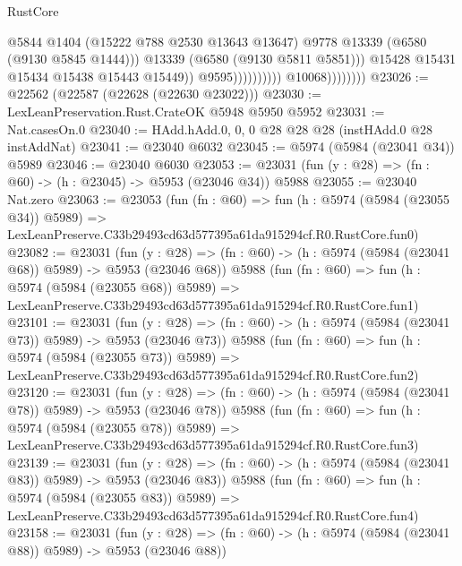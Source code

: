 \begin{lexlean}{RustCore}
\begin{coremodule}
                                                @5844
                                                @1404
                                                (@15222 @788 @2530 @13643 @13647)
                                                @9778
                                                @13339
                                                (@6580 (@9130 @5845 @1444)))
                                              @13339
                                              (@6580 (@9130 @5811 @5851)))
                                            @15428
                                            @15431
                                            @15434
                                            @15438
                                            @15443
                                            @15449))
                                        @9595))))))))))
                    @10068))))))))
@23026 := @22562 (@22587 (@22628 (@22630 @23022)))
@23030 := LexLeanPreservation.Rust.CrateOK @5948 @5950 @5952
@23031 := Nat.casesOn.{0}
@23040 := HAdd.hAdd.{0, 0, 0} @28 @28 @28 (instHAdd.{0} @28 instAddNat)
@23041 := @23040 @6032
@23045 := @5974 (@5984 (@23041 @34)) @5989
@23046 := @23040 @6030
@23053 := @23031 (fun (y : @28) => (fn : @60) -> (h : @23045) -> @5953 (@23046 @34)) @5988
@23055 := @23040 Nat.zero
@23063 := @23053
    (fun (fn : @60) =>
    fun (h : @5974 (@5984 (@23055 @34)) @5989) =>
    LexLeanPreserve.C33b29493cd63d577395a61da915294cf.R0.RustCore.fun0)
@23082 := @23031
    (fun (y : @28) => (fn : @60) -> (h : @5974 (@5984 (@23041 @68)) @5989) -> @5953 (@23046 @68))
    @5988
    (fun (fn : @60) =>
    fun (h : @5974 (@5984 (@23055 @68)) @5989) =>
    LexLeanPreserve.C33b29493cd63d577395a61da915294cf.R0.RustCore.fun1)
@23101 := @23031
    (fun (y : @28) => (fn : @60) -> (h : @5974 (@5984 (@23041 @73)) @5989) -> @5953 (@23046 @73))
    @5988
    (fun (fn : @60) =>
    fun (h : @5974 (@5984 (@23055 @73)) @5989) =>
    LexLeanPreserve.C33b29493cd63d577395a61da915294cf.R0.RustCore.fun2)
@23120 := @23031
    (fun (y : @28) => (fn : @60) -> (h : @5974 (@5984 (@23041 @78)) @5989) -> @5953 (@23046 @78))
    @5988
    (fun (fn : @60) =>
    fun (h : @5974 (@5984 (@23055 @78)) @5989) =>
    LexLeanPreserve.C33b29493cd63d577395a61da915294cf.R0.RustCore.fun3)
@23139 := @23031
    (fun (y : @28) => (fn : @60) -> (h : @5974 (@5984 (@23041 @83)) @5989) -> @5953 (@23046 @83))
    @5988
    (fun (fn : @60) =>
    fun (h : @5974 (@5984 (@23055 @83)) @5989) =>
    LexLeanPreserve.C33b29493cd63d577395a61da915294cf.R0.RustCore.fun4)
@23158 := @23031
    (fun (y : @28) => (fn : @60) -> (h : @5974 (@5984 (@23041 @88)) @5989) -> @5953 (@23046 @88))

\end{coremodule}
\end{lexlean}
